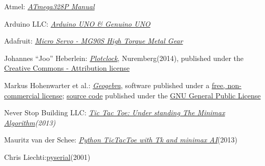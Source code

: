 \documentclass{sig-alternate-05-2015}
\begin{document}
\begin{thebibliography}{Atm}
	
	Atmel: \emph{\href{https://cdn.sparkfun.com/datasheets/Kits/doc8161.pdf.}{ATmega328P Manual}}
	
	{Arduino LLC:
	\emph{\href{https://www.arduino.cc/en/Main/ArduinoBoardUno}{Arduino UNO \& Genuino UNO}}}
	
	Adafruit: \emph{\href{https://www.adafruit.com/products/1143}{Micro Servo - MG90S High Torque Metal Gear}}
	
	Johannes ``Joo'' Heberlein: \emph{\href{http://www.thingiverse.com/thing:248009}{Plotclock}}, Nuremberg(2014), published under the \href{https://creativecommons.org/licenses/by/3.0/}{Creative Commons - Attribution license}
	
	Markus Hohenwarter et al.: \emph{\href{geogebra.org}{Geogebra}}, software published under a \href{https://www.geogebra.org/license}{free, non-commercial license}; \href{https://dev.geogebra.org/trac}{source code} published under the \href{http://www.gnu.org/licenses/gpl.html}{GNU General Public License}
	
	{Never Stop Building LLC}: \emph{\href{http://neverstopbuilding.com/minimax}{Tic Tac Toe: Under standing The Minimax Algorithm}(2013)}
	
	Mauritz van der Schee: \emph{\href{https://www.leaseweb.com/labs/2013/12/python-tictactoe-tk-minimax-ai/}{Python TicTacToe with Tk and minimax AI}}(2013)
	
	Chris Liechti:\href{https://pythonhosted.org/pyserial/}{pyserial}(2001)
	
\end{thebibliography}
\end{document}
